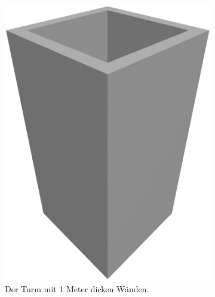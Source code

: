 \begin{figure}[ht!]
  \hspace*{\fill}%
  \begin{subfigure}[b]{0.3\columnwidth}
    \includegraphics[width=\columnwidth]{fig/scenario1_render_base_thin.png}
    \caption{Der Turm mit 1 Meter dicken Wänden.}\label{fig:poc:scenario1_wall_thin}
  \end{subfigure}
  \hfill%
  \begin{subfigure}[b]{0.3\columnwidth}

\end{subfigure}
\end{figure}
